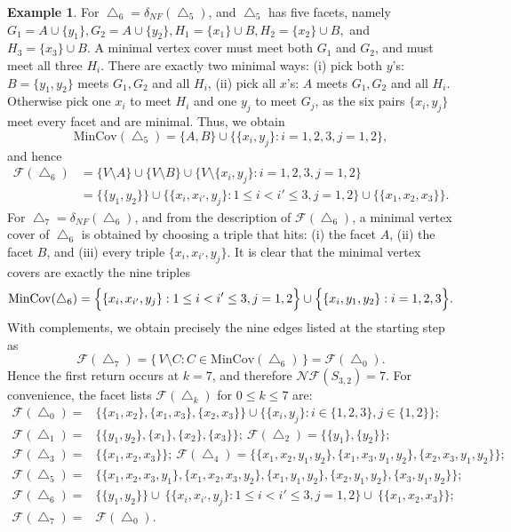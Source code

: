 \documentclass[12pt]{article}
\theoremstyle{plain}
\theoremstyle{definition}
\newtheorem{example}[theorem]{Example}
\newcommand{\MIN}{\mathrm{MinCov}}
\begin{document}
\begin{example}
		For \(\bigtriangleup_6=\delta_{NF}(\bigtriangleup_5)\), and \(\bigtriangleup_5\) has five facets, namely 
		 $G_1=A\cup\{y_1\}, G_2=A\cup\{y_2\},
		H_1=\{x_1\}\cup B, H_2=\{x_2\}\cup B,$ and $ H_3=\{x_3\}\cup B.$ 
		A minimal vertex cover must meet both \(G_1\) and \(G_2\), and must meet all three \(H_i\).
		There are exactly two minimal ways: (i) pick both \(y\)'s: \(B=\{y_1,y_2\}\) meets \(G_1,G_2\) and all \(H_i\), (ii)  pick all \(x\)'s: \(A\) meets \(G_1,G_2\) and all \(H_i\). Otherwise pick one \(x_i\) to meet \(H_i\) and one \(y_j\) to meet \(G_j\), as the six pairs \(\{x_i,y_j\}\) meet every facet and are minimal. Thus, we obtain
		\[
		\MIN(\bigtriangleup_5)=\{A, B\} \cup \bigl\{\{x_i,y_j\}: i=1,2,3, j=1,2\bigr\},
		\]
		and hence 
		\begin{align*}
			\mathcal{F}(\bigtriangleup_6)
			&=\{V\setminus A\} \cup \{V\setminus B\} \cup \bigl\{V\setminus\{x_i,y_j\}: i=1,2,3, j=1,2\bigr\}\\
			&=\bigl\{\{y_1,y_2\}\bigr\} \cup \bigl\{\{x_i,x_{i'},y_j\}:1\le i<i'\le 3, j=1,2\bigr\} \cup \bigl\{\{x_1,x_2,x_3\}\bigr\}.
		\end{align*}
		For \(\bigtriangleup_7=\delta_{NF}(\bigtriangleup_6)\), and from the description of \(\mathcal{F}(\bigtriangleup_6)\), a minimal vertex cover of \(\bigtriangleup_6\) is obtained by choosing a triple that hits:
		(i) the facet \(A\),
		(ii) the facet \(B\),
		and (iii) every triple \(\{x_i,x_{i'},y_j\}\).
		It is clear that the minimal vertex covers are exactly the nine triples
		\[
		\MIN(\bigtriangleup_6)=\Bigl\{
		\{x_i,x_{i'},y_j\}:1\le i<i'\le 3, j=1,2
		\Bigr\} \cup \Bigl\{\{x_i,y_1,y_2\}: i=1,2,3\Bigr\}.
		\]
		With complements, we obtain precisely the nine edges listed at the starting step as
		\[
		\mathcal{F}(\bigtriangleup_7)=\{\,V\setminus C: C\in \MIN(\bigtriangleup_6)\,\}=\mathcal{F}(\bigtriangleup_0).
		\]
		Hence the first return occurs at \(k=7\), and therefore $\mathcal{NF}(S_{3,2})=7.$ 
		 For convenience, the facet lists \(\mathcal{F}(\bigtriangleup_k)\) for \(0\le k\le 7\) are:
		\begin{align*}
			\mathcal{F}(\bigtriangleup_0)= &\{\{x_1,x_2\},\{x_1,x_3\},\{x_2,x_3\}\}
			\cup\{\{x_i,y_j\}: i\in\{1,2,3\}, j\in\{1,2\}\};\\
			\mathcal{F}(\bigtriangleup_1)= &\bigl\{\{y_1,y_2\},\{x_1\},\{x_2\},\{x_3\}\bigr\};~
			\mathcal{F}(\bigtriangleup_2)= \bigl\{\{y_1\},\{y_2\}\bigr\};\\	\mathcal{F}(\bigtriangleup_3)=&\bigl\{\{x_1,x_2,x_3\}\bigr\};~	\mathcal{F}(\bigtriangleup_4)= \bigl\{\{x_1,x_2,y_1,y_2\},\{x_1,x_3,y_1,y_2\},\{x_2,x_3,y_1,y_2\}\bigr\};\\[4pt]
			\mathcal{F}(\bigtriangleup_5)= &
			\bigl\{\{x_1,x_2,x_3,y_1\},\{x_1,x_2,x_3,y_2\},\{x_1,y_1,y_2\},\{x_2,y_1,y_2\},\{x_3,y_1,y_2\}\bigr\};\\[4pt]
			\mathcal{F}(\bigtriangleup_6)= &
			\bigl\{\{y_1,y_2\}\bigr\} \cup\
			\bigl\{\{x_i,x_{i'},y_j\}:1\le i<i'\le 3, j=1,2\bigr\} \cup\
			\bigl\{\{x_1,x_2,x_3\}\bigr\};\\[4pt]
			\mathcal{F}(\bigtriangleup_7)= &\mathcal{F}(\bigtriangleup_0).
		\end{align*}
	\end{example}
\end{document}
